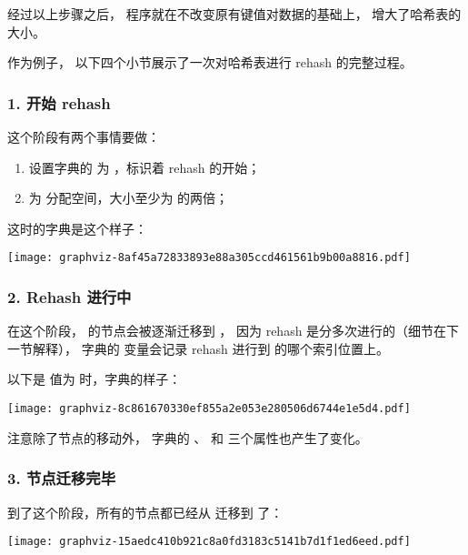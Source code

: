 \documentclass[a4paper,11pt,english]{sphinxmanual}
\begin{document}
经过以上步骤之后，
程序就在不改变原有键值对数据的基础上，
增大了哈希表的大小。

作为例子，
以下四个小节展示了一次对哈希表进行 rehash 的完整过程。


\subsubsection{1. 开始 rehash}
\label{internal-datastruct/dict:id14}
这个阶段有两个事情要做：
\begin{enumerate}
\item {} 
设置字典的  为  ，标识着 rehash 的开始；

\item {} 
为  分配空间，大小至少为  的两倍；

\end{enumerate}

这时的字典是这个样子：

\texttt{[image: graphviz-8af45a72833893e88a305ccd461561b9b00a8816.pdf]}


\subsubsection{2. Rehash 进行中}
\label{internal-datastruct/dict:id15}
在这个阶段，  的节点会被逐渐迁移到  ，
因为 rehash 是分多次进行的（细节在下一节解释），
字典的  变量会记录 rehash 进行到  的哪个索引位置上。

以下是  值为  时，字典的样子：

\texttt{[image: graphviz-8c861670330ef855a2e053e280506d6744e1e5d4.pdf]}

注意除了节点的移动外，
字典的  、  和  三个属性也产生了变化。


\subsubsection{3. 节点迁移完毕}
\label{internal-datastruct/dict:id16}
到了这个阶段，所有的节点都已经从  迁移到  了：

\texttt{[image: graphviz-15aedc410b921c8a0fd3183c5141b7d1f1ed6eed.pdf]}
\end{document}
